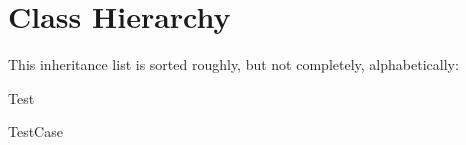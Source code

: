 \section{Class Hierarchy}
This inheritance list is sorted roughly, but not completely, alphabetically\-:\begin{DoxyCompactList}
\item Test\begin{DoxyCompactList}
\item {}
\end{DoxyCompactList}
\item Test\-Case\begin{DoxyCompactList}
\item {}
\end{DoxyCompactList}
\end{DoxyCompactList}
